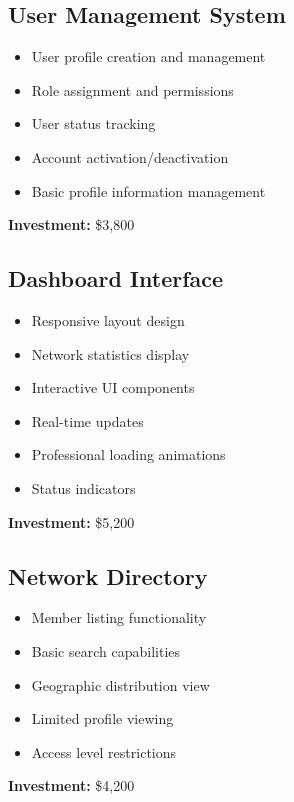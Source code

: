 \documentclass[11pt,a4paper]{article}
\begin{document}
\subsection{User Management System}
\begin{tcolorbox}[colback=white,colframe=primaryBlue!20,title=Module Details]
\begin{itemize}[leftmargin=*]
    \item User profile creation and management
    \item Role assignment and permissions
    \item User status tracking
    \item Account activation/deactivation
    \item Basic profile information management
\end{itemize}
\textbf{Investment:} \$3,800
\end{tcolorbox}

\subsection{Dashboard Interface}
\begin{tcolorbox}[colback=white,colframe=primaryBlue!20,title=Module Details]
\begin{itemize}[leftmargin=*]
    \item Responsive layout design
    \item Network statistics display
    \item Interactive UI components
    \item Real-time updates
    \item Professional loading animations
    \item Status indicators
\end{itemize}
\textbf{Investment:} \$5,200
\end{tcolorbox}

\subsection{Network Directory}
\begin{tcolorbox}[colback=white,colframe=primaryBlue!20,title=Module Details]
\begin{itemize}[leftmargin=*]
    \item Member listing functionality
    \item Basic search capabilities
    \item Geographic distribution view
    \item Limited profile viewing
    \item Access level restrictions
\end{itemize}
\textbf{Investment:} \$4,200
\end{tcolorbox}
\end{document}
